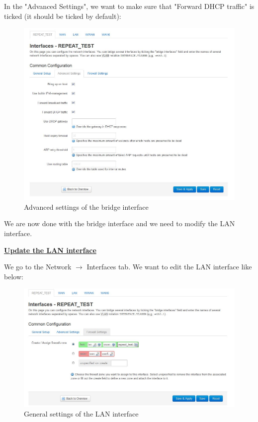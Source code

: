In the "Advanced Settings", we want to make sure that "Forward DHCP traffic" is ticked (it should be ticked by default):
\begin{figure}[H]
\begin{center}
\includegraphics[width=\columnwidth]{image/interface4.jpg}%
\caption{Advanced settings of the bridge interface}%
\label{figure:interface4}%
\end{center}
\end{figure}

We are now done with the bridge interface and we need to modify the LAN interface.



\hfill \break \underline{\textbf{Update the LAN interface}}

We go to the Network $\rightarrow$ Interfaces tab. We want to edit the LAN interface like below:
\begin{figure}[H]
\begin{center}
\includegraphics[width=\columnwidth]{image/interface5.jpg}%
\caption{General settings of the LAN interface}%
\label{figure:interface5}%
\end{center}
\end{figure} 

